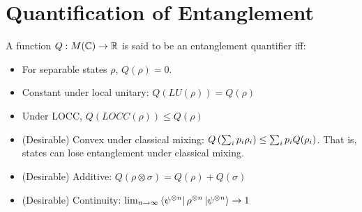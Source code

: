 \section{Quantification of Entanglement}
A function $Q: M(\mathbb{C}) \to \mathbb{R}$ is said to be an entanglement quantifier iff:
\begin{itemize}
    \item For separable states $\rho$, $Q(\rho) = 0$.
    \item Constant under local unitary: $Q(LU (\rho)) = Q(\rho)$
    \item Under LOCC, $Q(LOCC(\rho)) \leq Q(\rho)$
    \item (Desirable) Convex under classical mixing: $Q\left(\sum_i p_i \rho_i\right) \leq \sum_i p_i Q(\rho_i)$.
        That is, states can lose entanglement under classical mixing.
    \item (Desirable) Additive: $Q(\rho \otimes \sigma) = Q(\rho) + Q(\sigma)$
    \item (Desirable) Continuity: $\lim_{n \to \infty} \bra{\psi^{\otimes n}} \rho^{\otimes n} \ket{\psi^{\otimes n}} \rightarrow 1$
\end{itemize}



